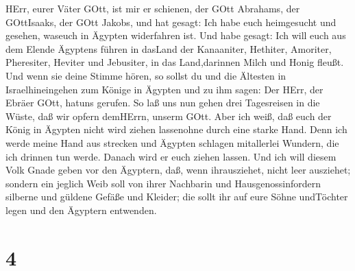HErr, eurer Väter GOtt, ist mir er schienen, der GOtt Abrahams, der
GOttIsaaks, der GOtt Jakobs, und hat gesagt: Ich habe euch heimgesucht
und gesehen, waseuch in Ägypten widerfahren ist.  Und habe
gesagt: Ich will euch aus dem Elende Ägyptens führen in dasLand der
Kanaaniter, Hethiter, Amoriter, Pheresiter, Heviter und Jebusiter, in
das Land,darinnen Milch und Honig fleußt.  Und wenn sie
deine Stimme hören, so sollst du und die Ältesten in Israelhineingehen
zum Könige in Ägypten und zu ihm sagen: Der HErr, der Ebräer GOtt,
hatuns gerufen. So laß uns nun gehen drei Tagesreisen in die Wüste, daß
wir opfern demHErrn, unserm GOtt.  Aber ich weiß, daß euch
der König in Ägypten nicht wird ziehen lassenohne durch eine starke
Hand.  Denn ich werde meine Hand aus strecken und Ägypten
schlagen mitallerlei Wundern, die ich drinnen tun werde. Danach wird er
euch ziehen lassen.  Und ich will diesem Volk Gnade geben
vor den Ägyptern, daß, wenn ihrausziehet, nicht leer ausziehet;
 sondern ein jeglich Weib soll von ihrer Nachbarin und
Hausgenossinfordern silberne und güldene Gefäße und Kleider; die sollt
ihr auf eure Söhne undTöchter legen und den Ägyptern entwenden.

\hypertarget{section-3}{%
\section{4}\label{section-3}}


